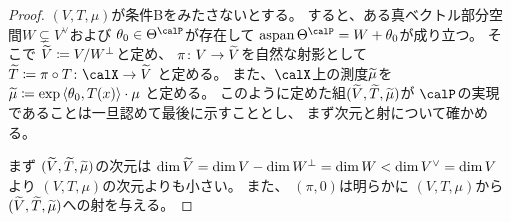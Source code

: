 \documentclass[report]{jlreq}
\begin{document}

\begin{proof}
    $(V, T, \mu)$が条件Bをみたさないとする。
    すると、ある真ベクトル部分空間$W \subsetneq V^\vee$および
    $\theta_0 \in \Theta^\calP$が存在して
    $\aspan\Theta^\calP = W + \theta_0$が成り立つ。
    そこで
    $\widetilde{V} \coloneqq V / W^\perp$と定め、
    $\pi \colon V \to \widetilde{V}$を自然な射影として
    $\wt{T} \coloneqq \pi \circ T \colon \calX \to \wt{V}$
    と定める。
    また、$\calX$上の測度$\widetilde{\mu}$を
    $\widetilde{\mu} \coloneqq \exp\left\langle{\theta_0},{T(x)}\right\rangle \cdot \mu$
    と定める。
    このように定めた組$(\widetilde{V}, \widetilde{T}, \widetilde{\mu})$が
    $\calP$の実現であることは一旦認めて最後に示すこととし、
    まず次元と射について確かめる。

    まず
    $(\widetilde{V}, \widetilde{T}, \widetilde{\mu})$の次元は
    $\dim \widetilde{V} = \dim V - \dim W^\perp = \dim W < \dim V^\vee = \dim V$
    より
    $(V, T, \mu)$の次元よりも小さい。
    また、
    $(\pi, 0)$は明らかに
    $(V, T, \mu)$から$(\widetilde{V}, \widetilde{T}, \widetilde{\mu})$への射を与える。


\end{proof}
\end{document}
